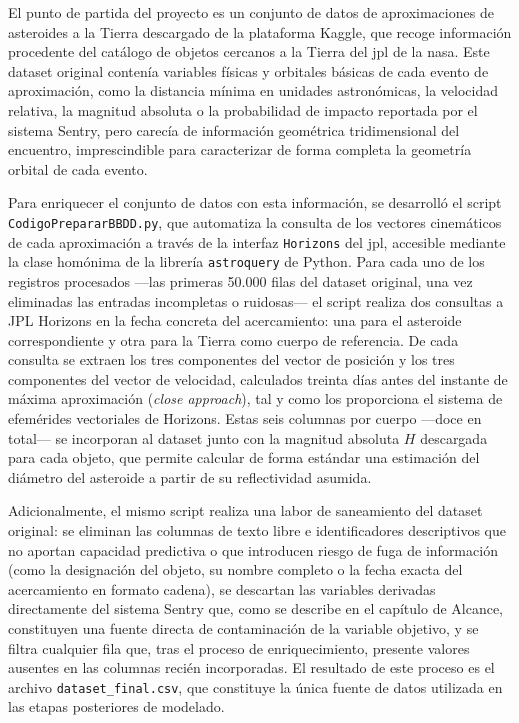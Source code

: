 \documentclass[12pt]{report} %
\begin{document}
El punto de partida del proyecto es un conjunto de datos de aproximaciones de asteroides a la Tierra descargado de la plataforma Kaggle, que recoge información procedente del catálogo de objetos cercanos a la Tierra del \gls{jpl} de la \gls{nasa}. Este dataset original contenía variables físicas y orbitales básicas de cada evento de aproximación, como la distancia mínima en unidades astronómicas, la velocidad relativa, la magnitud absoluta o la probabilidad de impacto reportada por el sistema Sentry, pero carecía de información geométrica tridimensional del encuentro, imprescindible para caracterizar de forma completa la geometría orbital de cada evento.
 
Para enriquecer el conjunto de datos con esta información, se desarrolló el script \texttt{CodigoPrepararBBDD.py}, que automatiza la consulta de los vectores cinemáticos de cada aproximación a través de la interfaz \texttt{Horizons} del \gls{jpl}, accesible mediante la clase homónima de la librería \texttt{astroquery} de Python. Para cada uno de los registros procesados ---las primeras 50.000 filas del dataset original, una vez eliminadas las entradas incompletas o ruidosas--- el script realiza dos consultas a JPL Horizons en la fecha concreta del acercamiento: una para el asteroide correspondiente y otra para la Tierra como cuerpo de referencia. De cada consulta se extraen los tres componentes del vector de posición y los tres componentes del vector de velocidad, calculados treinta días antes del instante de máxima aproximación (\textit{close approach}), tal y como los proporciona el sistema de efemérides vectoriales de Horizons. Estas seis columnas por cuerpo ---doce en total--- se incorporan al dataset junto con la magnitud absoluta $H$ descargada para cada objeto, que permite calcular de forma estándar una estimación del diámetro del asteroide a partir de su reflectividad asumida.
 
Adicionalmente, el mismo script realiza una labor de saneamiento del dataset original: se eliminan las columnas de texto libre e identificadores descriptivos que no aportan capacidad predictiva o que introducen riesgo de fuga de información (como la designación del objeto, su nombre completo o la fecha exacta del acercamiento en formato cadena), se descartan las variables derivadas directamente del sistema Sentry que, como se describe en el capítulo de Alcance, constituyen una fuente directa de contaminación de la variable objetivo, y se filtra cualquier fila que, tras el proceso de enriquecimiento, presente valores ausentes en las columnas recién incorporadas. El resultado de este proceso es el archivo \texttt{dataset\_final.csv}, que constituye la única fuente de datos utilizada en las etapas posteriores de modelado.
 
\end{document}
